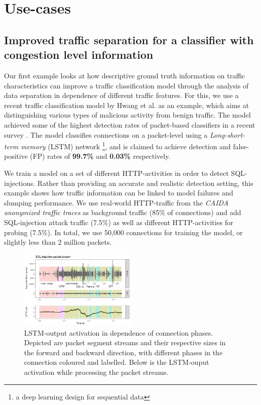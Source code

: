 \documentclass[runningheads]{llncs}
\begin{document}
\section{Use-cases}
\subsection{Improved traffic separation for a classifier with congestion level information}\label{Sec:Improvedtrafficsep}


Our first example looks at how descriptive ground truth information on traffic characteristics can improve a traffic classification model through the analysis of data separation in dependence of different traffic features. For this, we use a recent traffic classification model by Hwang et al. \cite{hwang2019lstm} as an example, which aims at distinguishing various types of malicious activity from benign traffic. The model achieved some of the highest detection rates of packet-based classifiers in a recent survey \cite{tahaei2020rise}.
The model classifies connections on a packet-level using a \textit{Long-short-term memory} (LSTM) network \footnote{a deep learning design for sequential data}, and is claimed to achieve detection and false-positive (FP) rates of \textbf{99.7\%} and \textbf{0.03\%} respectively. 


We train a model on a set of different HTTP-activities in order to detect SQL-injections. Rather than providing an accurate and realistic detection setting, this example shows how traffic information can be linked to model failures and slumping performance. We use real-world HTTP-traffic from the \textit{CAIDA anonymized traffic traces} \cite{walsworth2015caida} as background traffic (85\% of connections) and add SQL-injection attack traffic (7.5\%) as well as different HTTP-activities for probing (7.5\%). In total, we use 50,000 connections for training the model, or slightly less than 2 million packets. 


\begin{figure}
\centering
\includegraphics[width=0.5\textwidth]{images/LSTM_activation.png}
\caption{LSTM-output activation in dependence of connection phases. Depicted are packet segment streams and their respective sizes in the forward and backward direction, with different phases in the connection coloured and labelled. Below is the LSTM-ouput activation while processing the packet streams.}\label{fig:LSTM_act}
\end{figure}
\end{document}

